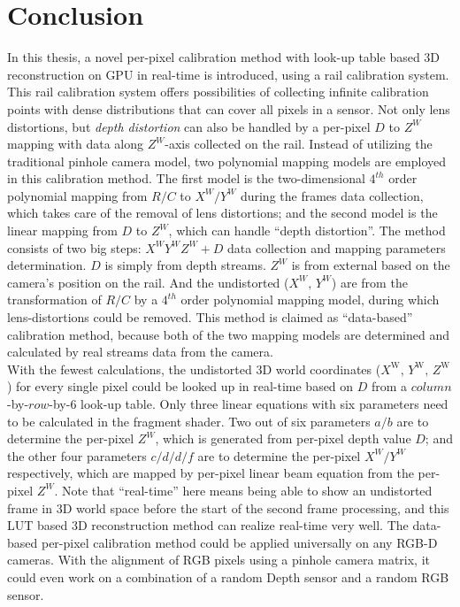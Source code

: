 \section{Conclusion}
\indent
In this thesis, a novel per-pixel calibration method with look-up table based 3D reconstruction on GPU in real-time is introduced, using a rail calibration system. This rail calibration system offers possibilities of collecting infinite calibration points with dense distributions that can cover all pixels in a sensor. Not only lens distortions, but \emph{depth distortion} can also be handled by a per-pixel \(D\) to \(Z^W\) mapping with data along \(Z^W\)-axis collected on the rail. Instead of utilizing the traditional pinhole camera model, two polynomial mapping models are employed in this calibration method. The first model is the two-dimensional \(4^{th}\) order polynomial mapping from \(R/C\) to \(X^W/Y^W\) during the frames data collection, which takes care of the removal of lens distortions; and the second model is the linear mapping from \(D\) to \(Z^W\), which can handle \enquote{depth distortion}. The method consists of two big steps: \(X^WY^WZ^W+D\) data collection and mapping parameters determination. \(D\) is simply from depth streams. \(Z^W\) is from external based on the camera's position on the rail. And the undistorted (\(X^W, \, Y^W\)) are from the transformation of \(R/C\) by a \(4^{th}\) order polynomial mapping model, during which lens-distortions could be removed. This method is claimed as \enquote{data-based} calibration method, because both of the two mapping models are determined and calculated by real streams data from the camera. 
\\\indent
With the fewest calculations, the undistorted 3D world coordinates (\(X^\text{W}, \, Y^\text{W}, \, Z^\text{W}\)) for every single pixel could be looked up in real-time based on \(D\) from a \(column\)-by-\(row\)-by-\(6\) look-up table. Only three linear equations with six parameters need to be calculated in the fragment shader. Two out of six parameters \(a/b\) are to determine the per-pixel \(Z^W\), which is generated from per-pixel depth value \(D\); and the other four parameters \(c/d/d/f\) are to determine the per-pixel \(X^W/Y^W\) respectively, which are mapped by per-pixel linear beam equation from the per-pixel \(Z^W\). Note that \enquote{real-time} here means being able to show an undistorted frame in 3D world space before the start of the second frame processing, and this LUT based 3D reconstruction method can realize real-time very well. The data-based per-pixel calibration method could be applied universally on any RGB-D cameras. With the alignment of RGB pixels using a pinhole camera matrix, it could even work on a combination of a random Depth sensor and a random RGB sensor.

